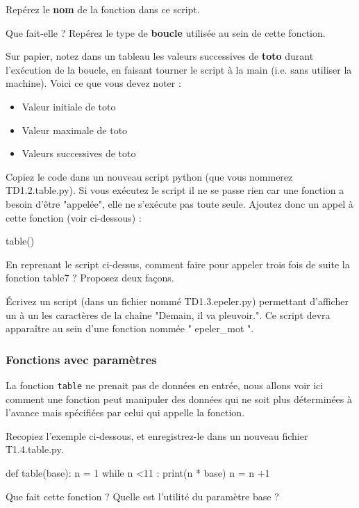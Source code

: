 Repérez le \textbf{nom} de la fonction dans ce script.

Que fait-elle ? Repérez le type de \textbf{boucle} utilisée au sein de cette fonction.

 Sur papier, notez dans un tableau les valeurs successives de \textbf{toto} durant l'exécution de la boucle, en faisant tourner le script à la main (i.e. sans utiliser la machine). Voici ce que vous devez noter :

\begin{itemize}
\item Valeur initiale de toto
\item Valeur maximale de toto
\item Valeurs successives de toto
\end{itemize}

 Copiez le code dans un nouveau script python (que vous nommerez TD1.2.table.py).
Si vous exécutez le script il ne se passe rien car une fonction a besoin d'être "appelée", elle ne s'exécute pas toute seule.
 Ajoutez donc un appel à cette fonction (voir ci-dessous) :
\begin{python}
table()
\end{python}

 En reprenant le script ci-dessus, comment faire pour appeler trois fois de suite la fonction table7 ? Proposez deux fa\c cons.

 \'Ecrivez un script (dans un fichier nommé TD1.3.epeler.py) permettant d'afficher un à un les caractères de la chaîne "Demain, il va pleuvoir.". Ce script devra apparaître au sein d'une fonction nommée " epeler\_mot ".


\subsubsection*{Fonctions avec paramètres}

La fonction \texttt{table} ne prenait pas de données en entrée, nous allons voir ici comment une fonction peut manipuler des données qui ne soit plus déterminées à l'avance mais spécifiées par celui qui appelle la fonction.

 Recopiez l'exemple ci-dessous, et enregistrez-le dans un nouveau fichier T1.4.table.py.
\begin{python}
def table(base):
  n = 1
  while n <11 :
    print(n * base)
    n = n +1
\end{python}

Que fait cette fonction ? Quelle est l'utilité du paramètre base ?

